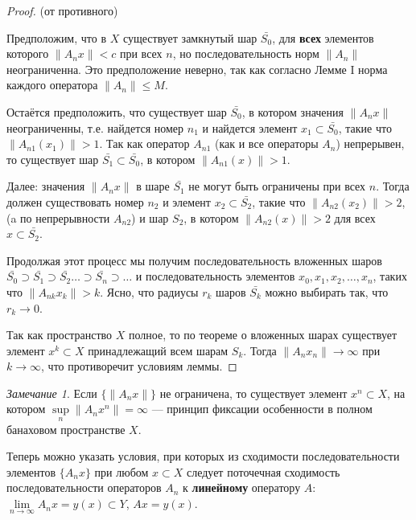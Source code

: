 \documentclass[12pt,a4paper,titlepage]{book}
\theoremstyle{definition}
\theoremstyle{plain}
\theoremstyle{remark}
\newtheorem*{remark}{Замечание}
\theoremstyle{remark}
\theoremstyle{remark}
\theoremstyle{plain}
\begin{document}
\begin{proof}
(от противного)

Предположим, что в $X$ существует замкнутый шар $\bar{S_0}$, для \textbf{всех} элементов которого $\lVert A_n x\rVert < c$ при всех $n$, но последовательность норм $\lVert A_n\rVert$ неограниченна. Это предположение неверно, так как согласно Лемме I норма каждого оператора $\lVert A_n\rVert \le M$.

Остаётся предположить, что существует шар $\bar{S_0}$, в котором значения $\lVert A_n x\rVert$ неограниченны, т.е. найдется номер $n_1$ и найдется элемент $x_1 \subset \bar{S_0}$, такие что $\lVert A_{n1} (x_1)\rVert > 1$. Так как оператор $A_{n1}$ (как и все операторы $A_n$) непрерывен, то существует шар $\bar{S_1} \subset \bar{S_0}$, в котором $\lVert A_{n1} (x)\rVert > 1$.

Далее: значения $\lVert A_n x\rVert$ в шаре $\bar{S_1}$ не могут быть ограничены при всех $n$. Тогда должен существовать номер $n_2$ и элемент $x_2 \subset \bar{S_2}$, такие что $\lVert A_{n2} (x_2)\rVert > 2$, (a по непрерывности $A_{n2}$) и шар $S_2$, в котором $\lVert A_{n2} (x)\rVert > 2$ для всех $x \subset \bar{S_2}$.

Продолжая этот процесс мы получим последовательность вложенных шаров $\bar{S_0} \supset \bar{S_1} \supset \bar{S_2} \ldots \supset \bar{S_n} \supset \ldots$ и последовательность элементов $x_0, x_1, x_2, \ldots, x_n$, таких что $\lVert A_{nk} x_k\rVert > k$. Ясно, что радиусы $r_k$ шаров $\bar{S_k}$ можно выбирать так, что $r_k \to 0$.

Так как пространство $X$ полное, то по теореме о вложенных шарах существует элемент $x^k \subset X$ принадлежащий всем шарам $S_k$. Тогда $\lVert A_n x_n\rVert \to \infty$ при $k \to \infty$, что противоречит условиям леммы.
\end{proof}

\begin{remark}
Если $\lbrace \lVert A_n x\rVert \rbrace$ не ограничена, то существует элемент $x^n \subset X$, на котором $\sup\limits_{n}\lVert A_n x^n\rVert = \infty$ --- принцип фиксации особенности в полном банаховом пространстве $X$.
\end{remark}

Теперь можно указать условия, при которых из сходимости последовательности элементов $\lbrace A_n x\rbrace$ при любом $x \subset X$ следует поточечная сходимость последовательности операторов $A_n$ к \textbf{линейному} оператору $A$: $\lim\limits_{n \to \infty}A_n x = y(x) \subset Y$, $Ax=y(x)$.
\end{document}
